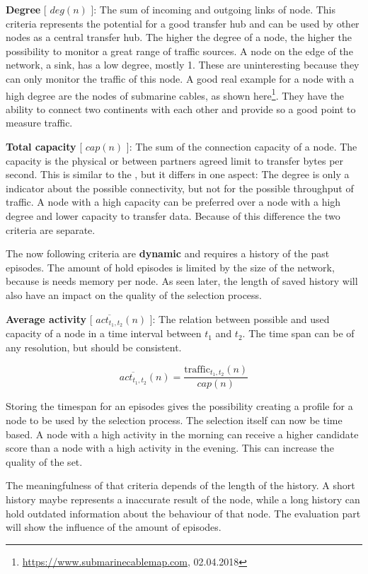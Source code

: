 \documentclass[thesis.tex]{subfiles}
\begin{document}
\textbf{Degree} [ $deg(n)$ ]: The sum of incoming and outgoing links of node. This criteria represents the potential for a good transfer hub and can be used by other nodes as a central transfer hub. The higher the degree of a node, the higher the possibility to monitor a great range of traffic sources. A node on the edge of the network, a sink, has a low degree, mostly 1. These are uninteresting because they can only monitor the traffic of this node. A good real example for a node with a high degree are the nodes of submarine cables, as shown here\footnote{\url{https://www.submarinecablemap.com}, 02.04.2018}. They have the ability to connect two continents with each other and provide so a good point to measure traffic.

\textbf{Total capacity} [ $cap(n)$ ]: The sum of the connection capacity of a node. The capacity is the physical or between partners agreed limit to transfer bytes per second. This is similar to the , but it differs in one aspect: The degree is only a indicator about the possible connectivity, but not for the possible throughput of traffic. A node with a high capacity can be preferred over a node with a high degree and lower capacity to transfer data. Because of this difference the two criteria are separate.

The now following criteria are \textbf{dynamic} and requires a history of the past episodes. The amount of hold episodes is limited by the size of the network, because is needs memory per node. As seen later, the length of saved history will also have an impact on the quality of the selection process.

\textbf{Average activity} [ $\overline{act_{t_1,t_2}}(n)$ ]: The relation between possible and used capacity of a node in a time interval between $t_1$ and $t_2$. The time span can be of any resolution, but should be consistent. 

\begin{equation}
\overline{act_{t_1,t_2}}(n) = \frac{\text{traffic}_{t_1,t_2}(n)}{cap(n)}
\end{equation}

Storing the timespan for an episodes gives the possibility creating a profile for a node to be used by the selection process. The selection itself can now be time based. A node with a high activity in the morning can receive a higher candidate score than a node with a high activity in the evening. This can increase the quality of the set.

The meaningfulness of that criteria depends of the length of the history. A short history maybe represents a inaccurate result of the node, while a long history can hold outdated information about the behaviour of that node. The evaluation part will show the influence of the amount of episodes.
\end{document}
